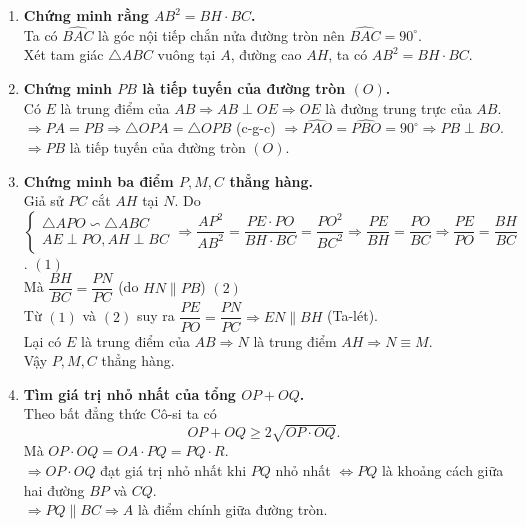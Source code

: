 \begin{ex}
{		\begin{enumerate}
			\item \textbf{Chứng minh rằng $AB^2=BH\cdot BC$.}\\
			Ta có $\widehat{BAC}$ là góc nội tiếp chắn nửa đường tròn nên $\widehat{BAC}=90^\circ$.\\
			Xét tam giác $\triangle ABC$ vuông tại $A$, đường cao $AH$, ta có $AB^2=BH\cdot BC$.
			\item \textbf{Chứng minh $PB$ là tiếp tuyến của đường tròn $(O)$.}\\
			Có $E$ là trung điểm của $AB\Rightarrow AB\perp OE \Rightarrow OE$ là đường trung trực của $AB$.\\
			$\Rightarrow PA=PB\Rightarrow \triangle OPA=\triangle OPB$ (c-g-c) $\Rightarrow \widehat{PAO}=\widehat{PBO}=90^\circ \Rightarrow PB\perp BO$.\\
			$\Rightarrow PB$ là tiếp tuyến của đường tròn $(O)$.
			\item \textbf{Chứng minh ba điểm $P,M,C$ thẳng hàng.}\\
			Giả sử $PC$ cắt $AH$ tại $N$. Do \\
			 $\begin{cases}	\triangle APO\backsim \triangle ABC \\ 
			AE\perp PO, AH\perp BC\end{cases} \Rightarrow \dfrac{AP^2}{AB^2}=\dfrac{PE\cdot PO}{BH \cdot BC}=\dfrac{PO^2}{BC^2} \Rightarrow \dfrac{PE}{BH}=\dfrac{PO}{BC}\Rightarrow \dfrac{PE}{PO}=\dfrac{BH}{BC}$. \hfill $(1)$\\
			Mà $\dfrac{BH}{BC}=\dfrac{PN}{PC}$ (do $HN\parallel PB$) \hfill $(2)$\\
			Từ $(1)$ và $(2)$ suy ra $\dfrac{PE}{PO}=\dfrac{PN}{PC}\Rightarrow EN\parallel BH$ (Ta-lét).\\
			Lại có $E$ là trung điểm của $AB\Rightarrow N$ là trung điểm $AH\Rightarrow N\equiv M$.\\
			Vậy $P,M,C$ thẳng hàng.
			\item \textbf{Tìm giá trị nhỏ nhất của tổng $OP+OQ$.}\\
			Theo bất đẳng thức Cô-si ta có
			$$OP+OQ\geqslant 2\sqrt{OP\cdot OQ}.$$
			Mà $OP\cdot OQ=OA\cdot PQ=PQ\cdot R$.\\
			$\Rightarrow OP\cdot OQ$ đạt giá trị nhỏ nhất khi $PQ$ nhỏ nhất $\Leftrightarrow PQ$ là khoảng cách giữa hai đường $BP$ và $CQ$.\\
			$\Rightarrow PQ\parallel BC\Rightarrow A$ là điểm chính giữa đường tròn.
		\end{enumerate}
	}
\end{ex}

